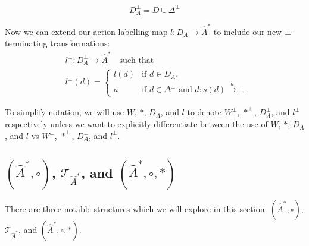 \begin{equation}
	D_{A}^{\bot} = D \cup \Delta^{\bot}
\end{equation}

Now we can extend our action labelling map $l: D_{A} \to \hat{A}^{\ast}$ to include our new $\bot$-terminating transformations:
\begin{align}
	 & l^{\bot} : D_{A}^{\bot} \to \hat{A}^{\ast} \quad\text{such that} \\
	 & l^{\bot}(d) =
	\begin{cases}
		l(d) & \text{if $d \in D_{A}$},                                            \\
		a    & \text{if $d \in \Delta^{\bot}$ and $d: s(d) \xrightarrow{a} \bot$.}
	\end{cases}
\end{align}

To simplify notation, we will use $W$, $\ast$, $D_{A}$, and $l$ to denote $W^{\bot}$, $\ast^{\bot}$, $D_{A}^{\bot}$, and $l^{\bot}$ respectively unless we want to explicitly differentiate between the use of $W$, $\ast$, $D_{A}$, and $l$ vs $W^{\bot}$, $\ast^{\bot}$, $D_{A}^{\bot}$, and $l^{\bot}$.


\subsection{$(\hat{A}^{\ast}, \circ)$, $\mathcal{T}_{\hat{A}^{\ast}}$, and $(\hat{A}^{\ast}, \circ, \ast)$}

There are three notable structures which we will explore in this section: $(\hat{A}^{\ast}, \circ)$, $\mathcal{T}_{\hat{A}^{\ast}}$, and $(\hat{A}^{\ast}, \circ, \ast)$.

